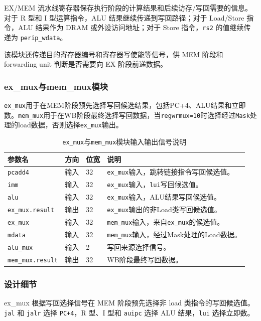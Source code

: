 \documentclass[12pt,a4paper]{ctexart}
\newcommand{\code}[1]{\texttt{#1}}
\begin{document}
EX/MEM 流水线寄存器保存执行阶段的计算结果和后续访存/写回需要的信息。对于 R 型和 I 型运算指令，ALU 结果继续传递到写回路径；对于 Load/Store 指令，ALU 结果作为 DRAM 或外设访问地址；对于 Store 指令，\code{rs2} 的值继续传递为 \code{perip\_wdata}。

该模块还传递目的寄存器编号和寄存器写使能等信号，供 MEM 阶段和 forwarding unit 判断是否需要向 EX 阶段前递数据。

\subsubsection{ex\_mux与mem\_mux模块}

\code{ex\_mux}用于在MEM阶段预先选择写回候选结果，包括PC+4、ALU结果和立即数。\code{mem\_mux}用于在WB阶段最终选择写回数据，当\code{regwrmux=10}时选择经过\code{Mask}处理的load数据，否则选择\code{ex\_mux}输出。

\begin{table}[H]
\centering
\caption{\code{ex\_mux}与\code{mem\_mux}模块输入输出信号说明}
\footnotesize
\renewcommand{\arraystretch}{1.15}
\begin{tabularx}{\textwidth}{p{3.2cm}p{1.5cm}p{2.1cm}X}
\toprule
参数名 & 方向 & 位宽 & 说明 \\
\midrule
\code{pcadd4} & 输入 & 32 & \code{ex\_mux}输入，跳转链接指令写回候选值。 \\
\code{imm} & 输入 & 32 & \code{ex\_mux}输入，\code{lui}写回候选值。 \\
\code{alu} & 输入 & 32 & \code{ex\_mux}输入，ALU结果写回候选值。 \\
\code{ex\_mux.result} & 输出 & 32 & \code{ex\_mux}输出的非Load类写回候选值。 \\
\code{ex\_mux} & 输入 & 32 & \code{mem\_mux}输入，来自\code{ex\_mux}的候选值。 \\
\code{mdata} & 输入 & 32 & \code{mem\_mux}输入，经过Mask处理的Load数据。 \\
\code{alu\_mux} & 输入 & 2 & 写回来源选择信号。 \\
\code{mem\_mux.result} & 输出 & 32 & WB阶段最终写回数据。 \\
\bottomrule
\end{tabularx}
\end{table}

\subsubsection*{设计细节}

ex\_mux 根据写回选择信号在 MEM 阶段预先选择非 load 类指令的写回候选值。\code{jal} 和 \code{jalr} 选择 \code{PC+4}，R 型、I 型和 \code{auipc} 选择 ALU 结果，\code{lui} 选择立即数。
\end{document}
